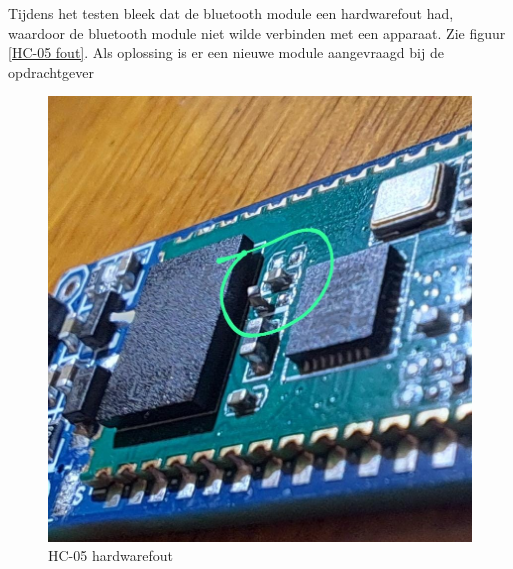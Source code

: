 Tijdens het testen bleek dat de bluetooth module een hardwarefout had, waardoor de bluetooth module niet wilde verbinden met een apparaat. Zie figuur \eqref{HC-05 fout}. Als oplossing is er een nieuwe module aangevraagd bij de opdrachtgever
\begin{figure}[h]
    \centering
    \includegraphics[scale = 0.2]{Media/Figuren/bluetooth hardwarefout.jpg}
    \caption{HC-05 hardwarefout}
    \label{HC-05 fout}
\end{figure}


